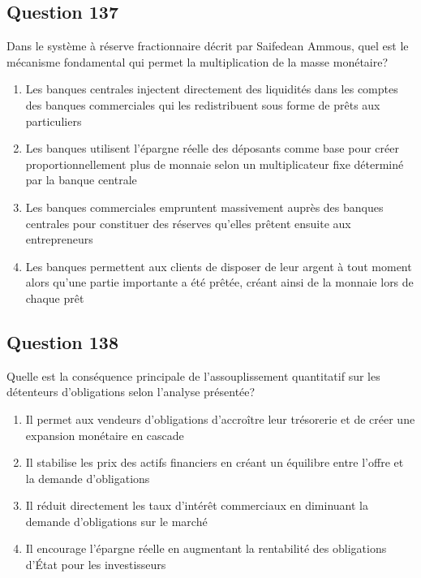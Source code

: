 \documentclass[12pt,a4paper]{article}
\begin{document}
\bigskip


\subsection*{Question 137}
Dans le système à réserve fractionnaire décrit par Saifedean Ammous, quel est le mécanisme fondamental qui permet la multiplication de la masse monétaire?

\begin{enumerate}[label=\Alph*., leftmargin=*]
\item Les banques centrales injectent directement des liquidités dans les comptes des banques commerciales qui les redistribuent sous forme de prêts aux particuliers
\item Les banques utilisent l'épargne réelle des déposants comme base pour créer proportionnellement plus de monnaie selon un multiplicateur fixe déterminé par la banque centrale
\item Les banques commerciales empruntent massivement auprès des banques centrales pour constituer des réserves qu'elles prêtent ensuite aux entrepreneurs
\item Les banques permettent aux clients de disposer de leur argent à tout moment alors qu'une partie importante a été prêtée, créant ainsi de la monnaie lors de chaque prêt
\end{enumerate}

\bigskip


\subsection*{Question 138}
Quelle est la conséquence principale de l'assouplissement quantitatif sur les détenteurs d'obligations selon l'analyse présentée?

\begin{enumerate}[label=\Alph*., leftmargin=*]
\item Il permet aux vendeurs d'obligations d'accroître leur trésorerie et de créer une expansion monétaire en cascade
\item Il stabilise les prix des actifs financiers en créant un équilibre entre l'offre et la demande d'obligations
\item Il réduit directement les taux d'intérêt commerciaux en diminuant la demande d'obligations sur le marché
\item Il encourage l'épargne réelle en augmentant la rentabilité des obligations d'État pour les investisseurs
\end{enumerate}
\end{document}
